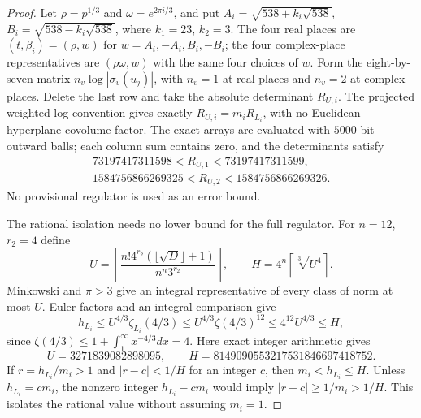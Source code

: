 \begin{proof}
Let $\rho=p^{1/3}$ and $\omega=e^{2\pi i/3}$, and put
$A_i=\sqrt{538+k_i\sqrt{538}}$, $B_i=\sqrt{538-k_i\sqrt{538}}$,
where $k_1=23$, $k_2=3$.
The four real places are $(t,\beta_i)=(\rho,w)$ for
$w=A_i,-A_i,B_i,-B_i$; the four complex-place representatives
are $(\rho\omega,w)$ with the same four choices of $w$.
Form the eight-by-seven matrix $n_v\log|\sigma_v(u_j)|$,
with $n_v=1$ at real places and $n_v=2$ at complex places.
Delete the last row and take the absolute determinant $R_{U,i}$.
The projected weighted-log convention gives exactly $R_{U,i}=m_iR_{L_i}$,
with no Euclidean hyperplane-covolume factor.
The exact arrays are evaluated with $5000$-bit outward balls;
each column sum contains zero, and the determinants satisfy
\[
 \begin{gathered}
 73197417311598<R_{U,1}<73197417311599,\\
 1584756866269325<R_{U,2}<1584756866269326.
 \end{gathered}
 \tag{G147C.13}
\]
No provisional regulator is used as an error bound.

The rational isolation needs no lower bound for the full regulator.
For $n=12$, $r_2=4$ define
\[
 U=\left\lceil\frac{n!4^{r_2}(\lfloor\sqrt D\rfloor+1)}
 {n^n3^{r_2}}\right\rceil,\qquad
 H=4^n\left\lceil\sqrt[3]{U^4}\right\rceil.
 \tag{G147C.14}
\]
Minkowski and $\pi>3$ give an integral representative of every class
of norm at most $U$.  Euler factors and an integral comparison give
\[
 h_{L_i}\le U^{4/3}\zeta_{L_i}(4/3)
 \le U^{4/3}\zeta(4/3)^{12}\le4^{12}U^{4/3}\le H,
 \tag{G147C.15}
\]
since $\zeta(4/3)\le1+\int_1^\infty x^{-4/3}dx=4$.
Here exact integer arithmetic gives
\[
 U=3271839082898095,\qquad H=8149090553217531846697418752.
 \tag{G147C.16}
\]
If $r=h_{L_i}/m_i>1$ and $|r-c|<1/H$ for an integer $c$,
then $m_i<h_{L_i}\le H$.  Unless $h_{L_i}=cm_i$, the nonzero
integer $h_{L_i}-cm_i$ would imply $|r-c|\ge1/m_i>1/H$.
This isolates the rational value without assuming $m_i=1$.


\end{proof}
